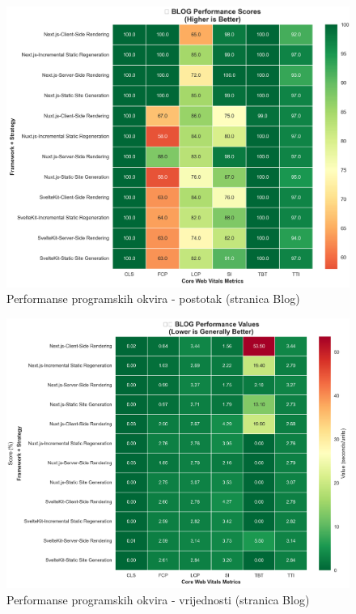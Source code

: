 \begin{figure}[H]
    \centering
    \includegraphics[width=\textwidth]{slike/rezultati/blog/blog_performance_scores.png}
    \caption{Performanse programskih okvira - postotak (stranica Blog)}
    \label{fig:testiranje-blog-postotak}
\end{figure}

\begin{figure}[H]
    \centering
    \includegraphics[width=\textwidth]{slike/rezultati/blog/blog_performance_values.png}
    \caption{Performanse programskih okvira - vrijednosti (stranica Blog)}
    \label{fig:testiranje-blog-vrijednosti}
\end{figure}

